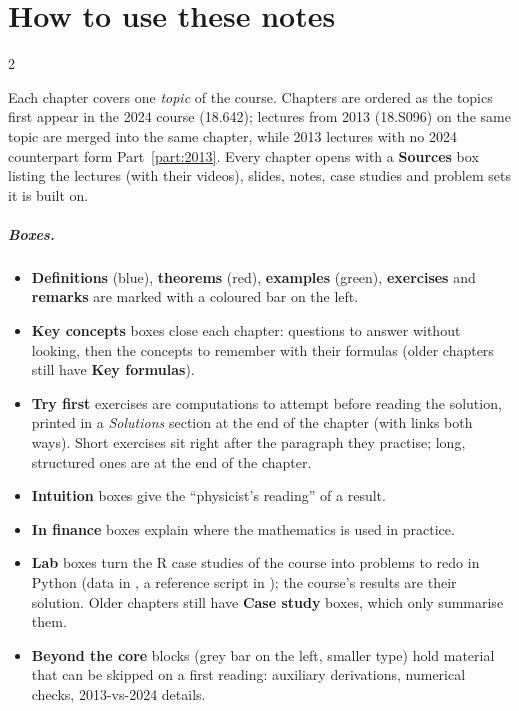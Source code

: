 \documentclass[11pt,oneside,openany]{book}
\begin{document}
\chapter*{How to use these notes}
\begin{paracol}{2}

Each chapter covers one \emph{topic} of the course. Chapters are ordered as the topics first
appear in the 2024 course (18.642); lectures from 2013 (18.S096) on the same topic are merged
into the same chapter, while 2013 lectures with no 2024 counterpart form
Part~\ref{part:2013}. Every chapter opens with a \textbf{Sources} box listing the lectures
(with their videos), slides, notes, case studies and problem sets it is built on.

\paragraph{Boxes.}
\begin{itemize}
  \item \textcolor{defcol}{\textbf{Definitions}} (blue), \textcolor{thmcol}{\textbf{theorems}} (red),
        \textcolor{intcol}{\textbf{examples}} (green), \textcolor{exerdark}{\textbf{exercises}} and
        \textcolor{srccol}{\textbf{remarks}} are marked with a coloured bar on the left.
  \item \textcolor{keycol}{\textbf{Key concepts}} boxes close each chapter: questions to answer without looking,
        then the concepts to remember with their formulas (older chapters still have \textbf{Key formulas}).
  \item \textcolor{exerdark}{\textbf{Try first}} exercises are computations to attempt before reading the
        solution, printed in a \emph{Solutions} section at the end of the chapter (with links both ways). Short
        exercises sit right after the paragraph they practise; long, structured ones are at the end of the chapter.
  \item \textcolor{intucol}{\textbf{Intuition}} boxes give the ``physicist's reading'' of a result.
  \item \textcolor{fincol}{\textbf{In finance}} boxes explain where the mathematics is used in practice.
  \item \textcolor{cscol}{\textbf{Lab}} boxes turn the R case studies of the course into problems to redo in
        Python (data in , a reference script in ); the course's results are their
        solution. Older chapters still have \textbf{Case study} boxes, which only summarise them.
  \item \textbf{Beyond the core} blocks (grey bar on the left, smaller type) hold material that can be
        skipped on a first reading: auxiliary derivations, numerical checks, 2013-vs-2024 details.
\end{itemize}


\end{paracol}
\end{document}
